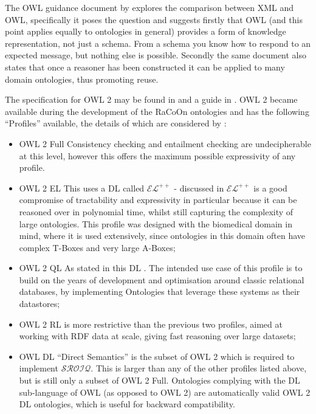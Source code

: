 The OWL guidance document by \citet{McGuinness04} explores the comparison between XML and OWL, specifically it poses the question  and suggests firstly that OWL (and this point applies equally to ontologies in general) provides a form of knowledge representation, not just a schema. From a schema you know how to respond to an expected message, but nothing else is possible. Secondly the same document also states that once a reasoner has been constructed it can be applied to many domain ontologies, thus promoting reuse.

The specification for OWL 2 may be found in \cite{Parsia:09:OWO} and a guide in \citet{Parsia12}. OWL 2 became available during the development of the RaCoOn ontologies and has the following ``Profiles'' available, the details of which are considered by \citet{Parsia12}:

\begin{itemize}
    \item OWL 2 Full Consistency checking and entailment checking are undecipherable at this level, however this offers the maximum possible expressivity of any profile. 
    \item OWL 2 EL This uses a DL called \(\mathcal{EL}^{++}\) - discussed in \citet{Baader2005} \(\mathcal{EL}^{++}\) is a good compromise of tractability and expressivity in particular because it can be reasoned over in polynomial time, whilst still capturing the complexity of large ontologies. This profile was designed with the biomedical domain in mind, where it is used extensively, since ontologies in this domain often have complex T-Boxes and very large A-Boxes;
    \item OWL 2 QL As stated in \citep{Parsia12} this DL . The intended use case of this profile is to build on the years of development and optimisation around classic relational databases, by implementing Ontologies that leverage these systems as their datastores;
    \item OWL 2 RL is more restrictive than the previous two profiles, aimed at working with RDF data at scale, giving fast reasoning over large datasets;
    \item OWL DL ``Direct Semantics'' is the subset of OWL 2 which is required to implement \(\mathcal{SROIQ}\). This is larger than any of the other profiles listed above, but is still only a subset of OWL 2 Full. Ontologies complying with the DL sub-language of OWL (as opposed to OWL 2) are automatically valid OWL 2 DL ontologies, which is useful for backward compatibility. 
\end{itemize}


